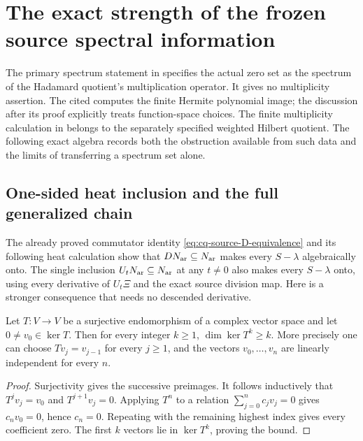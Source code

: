\section{The exact strength of the frozen source spectral information}
\label{sec:cq-source-spectral-strength}

The primary spectrum statement in \cite[Proposition~3.6(ii)]{cqCCM}
specifies the actual zero set as the spectrum of the Hadamard
quotient's multiplication operator. It gives no multiplicity
assertion. The cited \cite[Proposition~2.24]{cqCM} computes the
finite Hermite polynomial image; the discussion after its proof
explicitly treats function-space choices. The finite multiplicity
calculation in \cite[Theorem~2.47 and equations (2.447)--(2.449)]{cqCM}
belongs to the separately specified weighted Hilbert quotient.
The following exact algebra records both the obstruction available
from such data and the limits of transferring a spectrum set alone.

\subsection{One-sided heat inclusion and the full generalized chain}

The already proved commutator identity
\eqref{eq:cq-source-D-equivalence} and its following heat calculation
show that $DN_{\rm ar}\subseteq N_{\rm ar}$ makes every $S-\lambda$ algebraically
onto. The single inclusion $U_tN_{\rm ar}\subseteq N_{\rm ar}$ at any $t\ne0$
also makes every $S-\lambda$ onto, using every derivative
of $U_t\Xi$ and the exact source division map.
Here is a stronger consequence that needs no descended derivative.

\begin{cqlemma}
Let $T:V\to V$ be a surjective endomorphism of a complex vector
space and let $0\ne v_0\in\ker T$. Then for every integer $k\geq1$,
$\dim\ker T^k\geq k$. More precisely one can choose
$Tv_j=v_{j-1}$ for every $j\geq1$, and the vectors
$v_0,\ldots,v_n$ are linearly independent for every $n$.
\end{cqlemma}
\begin{proof}
Surjectivity gives the successive preimages. It follows inductively
that $T^jv_j=v_0$ and $T^{j+1}v_j=0$. Applying $T^n$ to a relation
$\sum_{j=0}^n c_jv_j=0$ gives $c_nv_0=0$, hence $c_n=0$.
Repeating with the remaining highest index gives every coefficient
zero. The first $k$ vectors lie in $\ker T^k$, proving the bound.
\end{proof}

